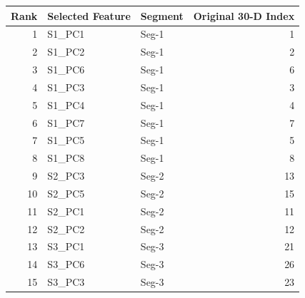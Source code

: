 \begin{tabular}{rllr}
\toprule
Rank & Selected Feature & Segment & Original 30-D Index \\
\midrule
1 & S1_PC1 & Seg-1 & 1 \\
2 & S1_PC2 & Seg-1 & 2 \\
3 & S1_PC6 & Seg-1 & 6 \\
4 & S1_PC3 & Seg-1 & 3 \\
5 & S1_PC4 & Seg-1 & 4 \\
6 & S1_PC7 & Seg-1 & 7 \\
7 & S1_PC5 & Seg-1 & 5 \\
8 & S1_PC8 & Seg-1 & 8 \\
9 & S2_PC3 & Seg-2 & 13 \\
10 & S2_PC5 & Seg-2 & 15 \\
11 & S2_PC1 & Seg-2 & 11 \\
12 & S2_PC2 & Seg-2 & 12 \\
13 & S3_PC1 & Seg-3 & 21 \\
14 & S3_PC6 & Seg-3 & 26 \\
15 & S3_PC3 & Seg-3 & 23 \\
\bottomrule
\end{tabular}
